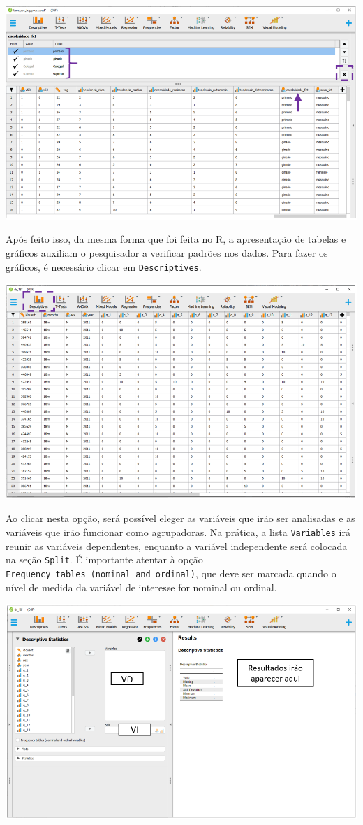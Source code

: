 \documentclass[
]{book}
\begin{document}
\includegraphics{./img/cap_anova_ordem_variaveis2.png}

Após feito isso, da mesma forma que foi feita no R, a apresentação de tabelas e gráficos auxiliam o pesquisador a verificar padrões nos dados. Para fazer os gráficos, é necessário clicar em \texttt{Descriptives}.

\includegraphics{./img/jasp_descriptives.png}

Ao clicar nesta opção, será possível eleger as variáveis que irão ser analisadas e as variáveis que irão funcionar como agrupadoras. Na prática, a lista \texttt{Variables} irá reunir as variáveis dependentes, enquanto a variável independente será colocada na seção \texttt{Split}. É importante atentar à opção \texttt{Frequency\ tables\ (nominal\ and\ ordinal)}, que deve ser marcada quando o nível de medida da variável de interesse for nominal ou ordinal.

\includegraphics{./img/jasp_descriptives2.png}
\end{document}
